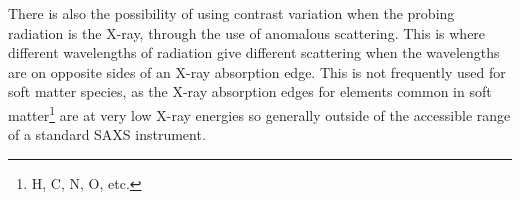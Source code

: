  There is also the possibility of using contrast variation when the probing radiation is the X-ray, through the use of anomalous scattering.
This is where different wavelengths of radiation give different scattering when the wavelengths are on opposite sides of an X-ray absorption edge.
This is not frequently used for soft matter species, as the X-ray absorption edges for elements common in soft matter\footnote{H, C, N, O, etc.} are at very low X-ray energies so generally outside of the accessible range of a standard SAXS instrument.\autocite{schurtenberger_contrast_2002}
